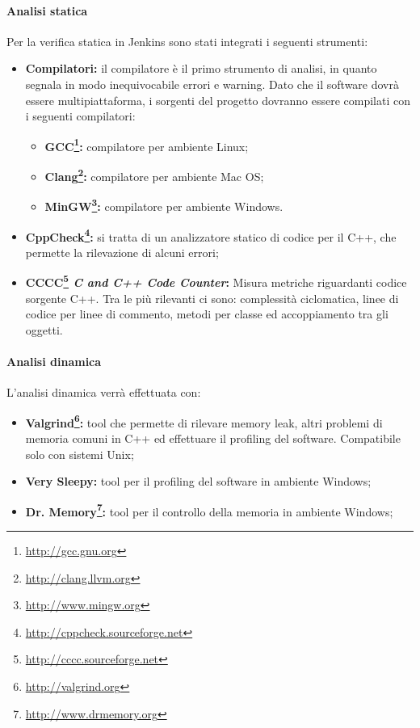 \paragraph{Analisi statica\\}
\label{analisi_statica}
Per la verifica statica in Jenkins sono stati integrati i seguenti strumenti:
\begin{itemize}
\item\textbf{Compilatori:} il compilatore è il primo strumento di analisi, in quanto segnala in modo inequivocabile errori e warning. Dato che il software dovrà essere multipiattaforma, i sorgenti del progetto dovranno essere compilati con i seguenti compilatori:
\begin{itemize}
\item\textbf{GCC\footnote{\url{http://gcc.gnu.org}}:} compilatore per ambiente Linux\glossario{};
\item\textbf{Clang\footnote{\url{http://clang.llvm.org}}:} compilatore per ambiente Mac OS\glossario{};
\item\textbf{MinGW\footnote{\url{http://www.mingw.org}}:} compilatore per ambiente Windows\glossario{}.
\end{itemize}
\item\textbf{CppCheck\footnote{\url{http://cppcheck.sourceforge.net}}:} si tratta di un analizzatore statico di codice per il C++\glossario{}, che permette la rilevazione di alcuni errori;
\item \textbf{CCCC\footnote{\url{http://cccc.sourceforge.net}} \textit{C and C++ Code Counter}:} Misura metriche riguardanti codice sorgente C++\g{}. Tra le più rilevanti ci sono: complessità ciclomatica, linee di codice per linee di commento, metodi per classe ed accoppiamento tra gli oggetti.
\end{itemize}

\paragraph{Analisi dinamica\\}
\label{analisi_dinamica}
L'analisi dinamica verrà effettuata con:
\begin{itemize}
\item\textbf{Valgrind\footnote{\url{http://valgrind.org}}:} tool\glossario{} che permette di rilevare memory leak\glossario{}, altri problemi di memoria comuni in C++\glossario{} ed effettuare il profiling\glossario{} del software. Compatibile solo con sistemi Unix;
\item\textbf{Very Sleepy:} tool per il profiling\glossario{} del software in ambiente Windows\glossario{};
\item\textbf{Dr. Memory\footnote{\url{http://www.drmemory.org}}:} tool per il controllo della memoria in ambiente Windows\glossario{};
\end{itemize}

